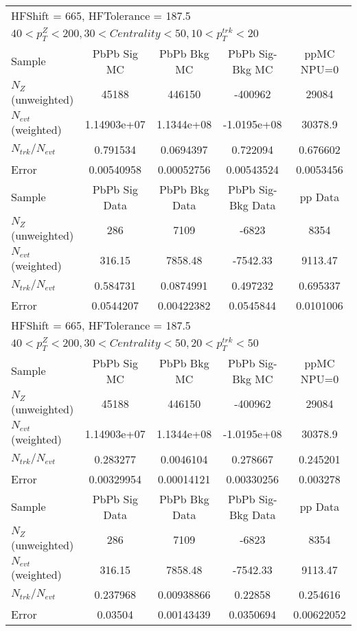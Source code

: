 \begin{table}[h!]
\centering
\begin{tabular}{|l|c|c|c|c|}
\multicolumn{5}{l}{ HFShift = 665, HFTolerance = 187.5}\\
\multicolumn{5}{l}{ $40 < p_{T}^{Z} < 200, 30 < Centrality < 50, 10 < p_{T}^{trk} < 20$}\\
\hline\hline
Sample         & PbPb Sig MC    & PbPb Bkg MC    & PbPb Sig-Bkg MC& ppMC NPU=0     \\
$N_Z$ (unweighted)& 45188          & 446150         & -400962        & 29084          \\
$N_{evt}$ (weighted)& 1.14903e+07    & 1.1344e+08     & -1.0195e+08    & 30378.9        \\
$N_{trk}/N_{evt}$& 0.791534       & 0.0694397      & 0.722094       & 0.676602       \\
Error          & 0.00540958     & 0.00052756     & 0.00543524     & 0.0053456      \\
\hline
Sample         & PbPb Sig Data  & PbPb Bkg Data  & PbPb Sig-Bkg Data& pp Data  \\
$N_Z$ (unweighted)& 286            & 7109           & -6823          & 8354           \\
$N_{evt}$ (weighted)& 316.15         & 7858.48        & -7542.33       & 9113.47        \\
$N_{trk}/N_{evt}$& 0.584731       & 0.0874991      & 0.497232       & 0.695337       \\
Error          & 0.0544207      & 0.00422382     & 0.0545844      & 0.0101006      \\
\hline\hline
\multicolumn{5}{l}{ HFShift = 665, HFTolerance = 187.5}\\
\multicolumn{5}{l}{ $40 < p_{T}^{Z} < 200, 30 < Centrality < 50, 20 < p_{T}^{trk} < 50$}\\
\hline\hline
Sample         & PbPb Sig MC    & PbPb Bkg MC    & PbPb Sig-Bkg MC& ppMC NPU=0     \\
$N_Z$ (unweighted)& 45188          & 446150         & -400962        & 29084          \\
$N_{evt}$ (weighted)& 1.14903e+07    & 1.1344e+08     & -1.0195e+08    & 30378.9        \\
$N_{trk}/N_{evt}$& 0.283277       & 0.0046104      & 0.278667       & 0.245201       \\
Error          & 0.00329954     & 0.00014121     & 0.00330256     & 0.003278       \\
\hline
Sample         & PbPb Sig Data  & PbPb Bkg Data  & PbPb Sig-Bkg Data& pp Data  \\
$N_Z$ (unweighted)& 286            & 7109           & -6823          & 8354           \\
$N_{evt}$ (weighted)& 316.15         & 7858.48        & -7542.33       & 9113.47        \\
$N_{trk}/N_{evt}$& 0.237968       & 0.00938866     & 0.22858        & 0.254616       \\
Error          & 0.03504        & 0.00143439     & 0.0350694      & 0.00622052     \\
\hline\hline
\end{tabular}
\end{table}
